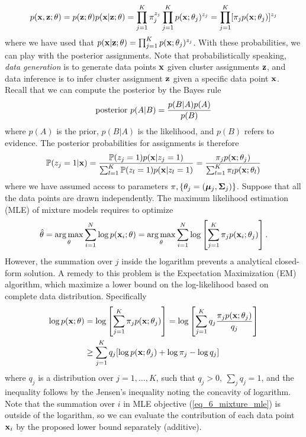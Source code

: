 \documentclass[../book-template.tex]{subfiles}
\begin{document}
\begin{equation*}
	p({\bf x,z};\theta) = p({\bf z};\theta)p({\bf x}|{\bf z};\theta) = \prod_{j=1}^{K}\pi_j^{z_j} \prod_{j=1}^{K}p({\bf x};\theta_j)^{z_j} = \prod_{j=1}^{K}[\pi_jp({\bf x};\theta_j)]^{z_j}
\end{equation*}
where we have used that $p({\bf x}|{\bf z};\theta) =\prod_{j=1}^{K}p({\bf x};\theta_j)^{z_j}$. With these probabilities, we can play with the posterior assignments. Note that probabilistically speaking, \emph{data generation} is to generate data points ${\bf x}$ given cluster assignments ${\bf z}$, and data inference is to infer cluster assignment ${\bf z}$ given a specific data point ${\bf x}$. Recall that we can compute the posterior by the Bayes rule
\begin{equation*}
	{\rm posterior}\ p(A|B)=\frac{p(B|A)p(A)}{p(B)}
\end{equation*}
where $p(A)$ is the prior, $p(B|A)$ is the likelihood, and $p(B)$ refers to evidence. The posterior probabilities for assignments is therefore
\begin{equation*}
	\mathbb{P}(z_j=1|{\bf x})=\frac{\mathbb{P}(z_j=1)p({\bf x}|z_j=1)}{\sum_{l=1}^{K}\mathbb{P}(z_l=1)p({\bf x}|z_l=1)}=\frac{\pi_jp({\bf x};\theta_j)}{\sum_{l=1}^{K}\pi_lp({\bf x};\theta_l)}
\end{equation*}
where we have assumed access to parameters $\pi, \{\theta_j=(\bm{\mu}_j,{\bf \Sigma}_j)\}$. Suppose that all the data points are drawn independently. The maximum likelihood estimation (MLE) of mixture models requires to optimize
\begin{equation}\label{eq_6_mixture_mle}
	\hat{\theta} = \mathop{\arg\max}_{\theta} \sum_{i=1}^{N}\log p({\bf x}_i;\theta) = \mathop{\arg\max}_{\theta} \sum_{i=1}^{N}\log \left[\sum_{j=1}^{K} \pi_jp({\bf x}_i;\theta_j)\right].
\end{equation}
However, the summation over $j$ inside the logarithm prevents a analytical closed-form solution. A remedy to this problem is the Expectation Maximization (EM) algorithm, which maximize a lower bound on the log-likelihood based on complete data distribution. Specifically
\begin{align}
	\log p({\bf x;\theta})&=\log \left[\sum_{j=1}^{K} \pi_jp({\bf x};\theta_j)\right]=\log \left[\sum_{j=1}^{K} q_j \frac{\pi_jp({\bf x};\theta_j)}{q_j} \right]\notag\\
	\label{eq_6_em_bd}&\geq \sum_{j=1}^{K}q_j[\log p({\bf x};\theta_j) +\log \pi_j - \log q_j]
\end{align}
where $q_j$ is a distribution over $j=1,\dots,K$, such that $q_j>0,\ \sum_j q_j=1$, and the inequality follows by the Jensen's inequality noting the concavity of logarithm. Note that the summation over $i$ in MLE objective (\ref{eq_6_mixture_mle}) is outside of the logarithm, so we can evaluate the contribution of each data point ${\bf x}_i$ by the proposed lower bound separately (additive).
\end{document}
